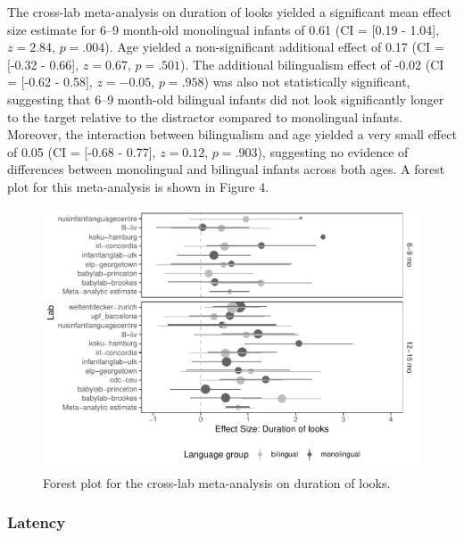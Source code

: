 \documentclass[english,,man,floatsintext]{apa6}
\begin{document}
The cross-lab meta-analysis on duration of looks yielded a significant mean effect size estimate for 6--9 month-old monolingual infants of 0.61 (CI = {[}0.19 - 1.04{]}, \(z = 2.84\), \(p = .004\)). Age yielded a non-significant additional effect of 0.17 (CI = {[}-0.32 - 0.66{]}, \(z = 0.67\), \(p = .501\)). The additional bilingualism effect of -0.02 (CI = {[}-0.62 - 0.58{]}, \(z = -0.05\), \(p = .958\)) was also not statistically significant, suggesting that 6--9 month-old bilingual infants did not look significantly longer to the target relative to the distractor compared to monolingual infants. Moreover, the interaction between bilingualism and age yielded a very small effect of 0.05 (CI = {[}-0.68 - 0.77{]}, \(z = 0.12\), \(p = .903\)), suggesting no evidence of differences between monolingual and bilingual infants across both ages. A forest plot for this meta-analysis is shown in Figure 4.

\begin{figure}
\centering
\includegraphics{gaze-following-paper_files/figure-latex/fig4-1.pdf}
\caption{\label{fig:fig4}Forest plot for the cross-lab meta-analysis on duration of looks.}
\end{figure}

\hypertarget{latency-1}{%
\subsubsection{Latency}\label{latency-1}}
\end{document}
